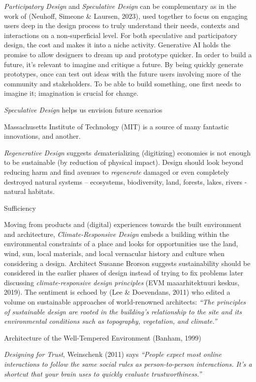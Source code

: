 \documentclass[
  letterpaper,
  DIV=11,
  numbers=noendperiod]{scrartcl}
\begin{document}
\emph{Participatory Design} and \emph{Speculative Design} can be
complementary as in the work of (Neuhoff, Simeone \& Laursen, 2023),
used together to focus on engaging users deep in the design process to
truly understand their needs, contexts and interactions on a
non-superficial level. For both speculative and participatory design,
the cost and makes it into a niche activity. Generative AI holds the
promise to allow designers to dream up and prototype quicker. In order
to build a future, it's relevant to imagine and critique a future. By
being quickly generate prototypes, once can test out ideas with the
future users involving more of the community and stakeholders. To be
able to build something, one first needs to imagine it; imagination is
crucial for change.

\emph{Speculative Design} helps us envision future scenarios

Massachusetts Institute of Technology (MIT) is a source of many
fantastic innovations, and another.

\emph{Regenerative Design} suggests \emph{de}materializing (digitizing)
economies is not enough to be sustainable (by reduction of physical
impact). Design should look beyond reducing harm and find avenues to
\emph{regenerate} damaged or even completely destroyed natural systems
-- ecosystems, biodiversity, land, forests, lakes, rivers - natural
habitats.

Sufficiency

Moving from products and (digital) experiences towards the built
environment and architecture, \emph{Climate-Responsive Design} embeds a
building within the environmental constraints of a place and looks for
opportunities use the land, wind, sun, local materials, and local
vernacular history and culture when considering a design. Architect
Susanne Brorson suggests sustainability should be considered in the
earlier phases of design instead of trying to fix problems later
discussing \emph{climate-responsive design principles} (EVM
maaarhitektuuri keskus, 2019). The sentiment is echoed by (Lee \&
Doevendans, 2011) who edited a volume on sustainable approaches of
world-renowned architects: \emph{``The principles of sustainable design
are rooted in the building's relationship to the site and its
environmental conditions such as topography, vegetation, and climate.''}

Architecture of the Well-Tempered Environment (Banham, 1999)

\emph{Designing for Trust}, Weinschenk (2011) says \emph{``People expect
most online interactions to follow the same social rules as
person-to-person interactions. It's a shortcut that your brain uses to
quickly evaluate trustworthiness.''}
\end{document}
